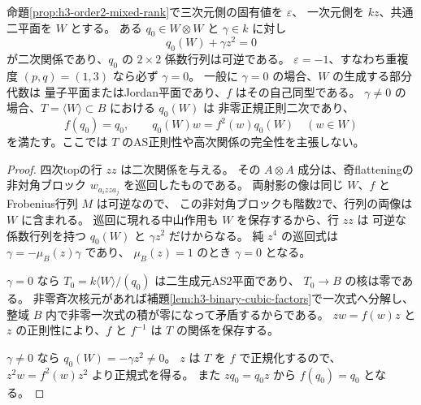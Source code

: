 \begin{corollary}[一次元固有空間の隣の二次関係]
\label{cor:h3-order2-plane-quadric}
命題\ref{prop:h3-order2-mixed-rank}で三次元側の固有値を $\varepsilon$、
一次元側を $kz$、共通二平面を $W$ とする。
ある $q_0\in W\otimes W$ と $\gamma\in k$ に対し
\[
 q_0(W)+\gamma z^2=0
\]
が二次関係であり、$q_0$ の $2\times2$ 係数行列は可逆である。
$\varepsilon=-1$、すなわち重複度 $(p,q)=(1,3)$ なら必ず $\gamma=0$。
一般に $\gamma=0$ の場合、$W$ の生成する部分代数は
量子平面またはJordan平面であり、$f$ はその自己同型である。
$\gamma\ne0$ の場合、$T=\langle W\rangle\subset B$ における $q_0(W)$ は
非零正規正則二次であり、
\[
 f(q_0)=q_0,\qquad q_0(W)w=f^2(w)q_0(W)\quad(w\in W)
\]
を満たす。ここでは $T$ のAS正則性や高次関係の完全性を主張しない。
\end{corollary}
\begin{proof}
四次topの行 $zz$ は二次関係を与える。
その $A\otimes A$ 成分は、奇flatteningの非対角ブロック
$w_{a_i z z a_j}$ を巡回したものである。
両射影の像は同じ $W$、$f$ とFrobenius行列 $M$ は可逆なので、
この非対角ブロックも階数2で、行列の両像は $W$ に含まれる。
巡回に現れる中山作用も $W$ を保存するから、行 $zz$ は
可逆な係数行列を持つ $q_0(W)$ と $\gamma z^2$ だけからなる。
純 $z^4$ の巡回式は $\gamma=-\mu_B(z)\gamma$ であり、
$\mu_B(z)=1$ のとき $\gamma=0$ となる。

$\gamma=0$ なら $T_0=k\langle W\rangle/(q_0)$ は二生成元AS2平面であり、
$T_0\to B$ の核は零である。
非零斉次核元があれば補題\ref{lem:h3-binary-cubic-factors}で一次式へ分解し、
整域 $B$ 内で非零一次式の積が零になって矛盾するからである。
$zw=f(w)z$ と $z$ の正則性により、$f$ と $f^{-1}$ は $T$ の関係を保存する。

$\gamma\ne0$ なら $q_0(W)=-\gamma z^2\ne0$。
$z$ は $T$ を $f$ で正規化するので、$z^2w=f^2(w)z^2$ より正規式を得る。
また $zq_0=q_0z$ から $f(q_0)=q_0$ となる。
\end{proof}

